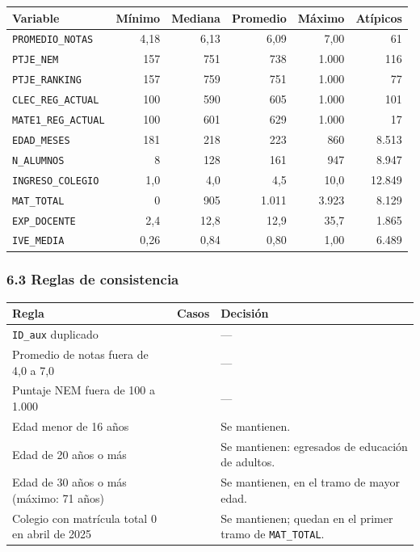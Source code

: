 \documentclass[11pt]{article}
\begin{document}
\begin{center}
\begin{tabular}{lrrrrr}
\toprule
\textbf{Variable} & \textbf{Mínimo} & \textbf{Mediana} & \textbf{Promedio} & \textbf{Máximo} & \textbf{Atípicos} \\
\midrule
\texttt{PROMEDIO\_NOTAS}    & 4,18  & 6,13  & 6,09   & 7,00  & 61 \\
\texttt{PTJE\_NEM}          & 157   & 751   & 738    & 1.000 & 116 \\
\texttt{PTJE\_RANKING}      & 157   & 759   & 751    & 1.000 & 77 \\
\texttt{CLEC\_REG\_ACTUAL}  & 100   & 590   & 605    & 1.000 & 101 \\
\texttt{MATE1\_REG\_ACTUAL} & 100   & 601   & 629    & 1.000 & 17 \\
\texttt{EDAD\_MESES}        & 181   & 218   & 223    & 860   & 8.513 \\
\texttt{N\_ALUMNOS}         & 8     & 128   & 161    & 947   & 8.947 \\
\texttt{INGRESO\_COLEGIO}   & 1,0   & 4,0   & 4,5    & 10,0  & 12.849 \\
\texttt{MAT\_TOTAL}         & 0     & 905   & 1.011  & 3.923 & 8.129 \\
\texttt{EXP\_DOCENTE}       & 2,4   & 12,8  & 12,9   & 35,7  & 1.865 \\
\texttt{IVE\_MEDIA}         & 0,26  & 0,84  & 0,80   & 1,00  & 6.489 \\
\bottomrule
\end{tabular}
\end{center}

\subsubsection*{6.3 \; Reglas de consistencia}

\begin{center}
\begin{tabular}{>{\raggedright\arraybackslash}p{7.6cm}
                >{\raggedleft\arraybackslash}p{1.6cm}
                >{\raggedright\arraybackslash}p{4.6cm}}
\toprule
\textbf{Regla} & \textbf{Casos} & \textbf{Decisión} \\
\midrule
\texttt{ID\_aux} duplicado & 0 & --- \\
Promedio de notas fuera de 4,0 a 7,0 & 0 & --- \\
Puntaje NEM fuera de 100 a 1.000 & 0 & --- \\
Edad menor de 16 años & 5 & Se mantienen. \\
Edad de 20 años o más & 4.439 & Se mantienen: egresados de educación de adultos. \\
Edad de 30 años o más (máximo: 71 años) & 1.898 & Se mantienen, en el tramo de mayor edad. \\
Colegio con matrícula total 0 en abril de 2025 & 4 & Se mantienen; quedan en el primer tramo de \texttt{MAT\_TOTAL}. \\
\bottomrule
\end{tabular}
\end{center}
\end{document}

